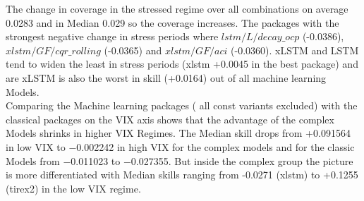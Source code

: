 The change in coverage in the stressed regime over all combinations on average 0.0283 and in Median 0.029 so the coverage increases. The packages with the strongest negative change in stress periods where $lstm/L/decay\_ocp$ (-0.0386), $xlstm/GF/cqr\_rolling$ (-0.0365) and $xlstm/GF/aci$ (-0.0360). xLSTM and LSTM tend to widen the least in stress periods (xlstm +0.0045 in the best package) and are xLSTM is also the worst in skill (+0.0164) out of all machine learning Models.\\
Comparing the Machine learning packages ( all const variants excluded) with the classical packages on the VIX axis shows that the advantage of the complex Models shrinks in higher VIX Regimes. The Median skill drops from +0.091564 in low VIX to −0.002242 in high VIX for the complex models and for the classic Models from −0.011023 to −0.027355. But inside the complex group the picture is more differentiated with Median skills ranging from -0.0271 (xlstm) to +0.1255 (tirex2) in the low VIX regime. \\
